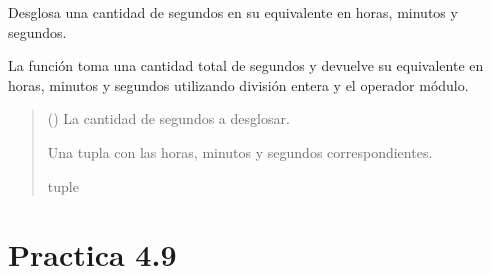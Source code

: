 \documentclass[letterpaper,10pt,spanish]{sphinxmanual}
\begin{document}
\begin{fulllineitems}
\label{\detokenize{pr4:pr4.8.desglosar_segundos}}
\pysigstartsignatures
{}
\pysigstopsignatures
\sphinxAtStartPar
Desglosa una cantidad de segundos en su equivalente en horas, minutos y segundos.

\sphinxAtStartPar
La función toma una cantidad total de segundos y devuelve su equivalente en
horas, minutos y segundos utilizando división entera y el operador módulo.
\begin{quote}\begin{description}
\sphinxAtStartPar
{} () \textendash{} La cantidad de segundos a desglosar.

\sphinxAtStartPar
Una tupla con las horas, minutos y segundos correspondientes.

\sphinxAtStartPar
tuple

\end{description}\end{quote}

\end{fulllineitems}



\section{Practica 4.9}
\label{\detokenize{pr4:module-pr4.9}}\label{\detokenize{pr4:practica-4-9}}
\end{document}
